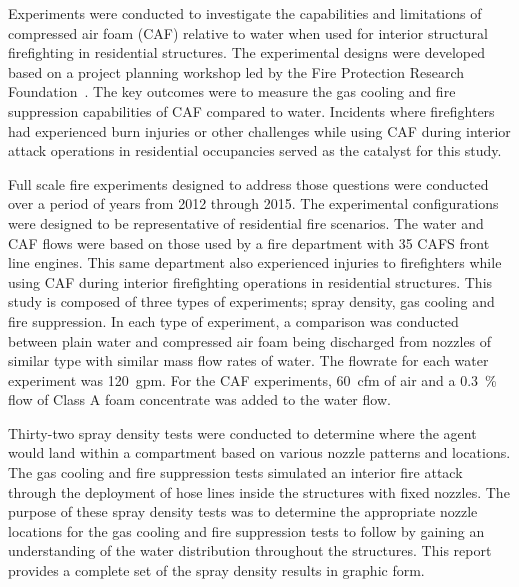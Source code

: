 \documentclass[12pt,oneside]{book}
\begin{document}
Experiments were conducted to investigate the capabilities and limitations of compressed air foam (CAF) relative to water when used for interior structural firefighting in residential structures. The experimental designs were developed based on a project planning workshop led by the Fire Protection Research Foundation~\cite{Grant:2011}. The key outcomes were to measure the gas cooling and fire suppression capabilities of CAF compared to water. Incidents where firefighters had experienced burn injuries or other challenges while using CAF during interior attack operations in residential occupancies served as the catalyst for this study.

Full scale fire experiments designed to address those questions were conducted over a period of years from 2012 through 2015. The experimental configurations were designed to be representative of residential fire scenarios. The water and CAF flows were based on those used by a fire department with 35 CAFS front line engines. This same department also experienced injuries to firefighters while using CAF during interior firefighting operations in residential structures. This study is composed of three types of experiments; spray density, gas cooling and fire suppression. In each type of experiment, a comparison was conducted between plain water and compressed air foam being discharged from nozzles of similar type with similar mass flow rates of water. The flowrate for each water experiment was 120~gpm. For the CAF experiments, 60~cfm of air and a 0.3~\% flow of Class A foam concentrate was added to the water flow.

Thirty-two spray density tests were conducted to determine where the agent would land within a compartment based on various nozzle patterns and locations. The gas cooling and fire suppression tests simulated an interior fire attack through the deployment of hose lines inside the structures with fixed nozzles. The purpose of these spray density tests was to determine the appropriate nozzle locations for the gas cooling and fire suppression tests to follow by gaining an understanding of the water distribution throughout the structures. This report provides a complete set of the spray density results in graphic form.
\end{document}

